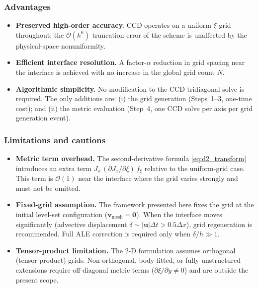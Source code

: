 \documentclass[10pt,a4paper,twocolumn]{article}
\newcommand{\Ord}[1]{\mathcal{O}(#1)}
\begin{document}
\subsubsection*{Advantages}
\begin{itemize}\setlength\itemsep{2pt}
  \item \textbf{Preserved high-order accuracy.}  CCD operates on a uniform
    $\xi$-grid throughout; the $\Ord{h^6}$ truncation error of the scheme
    is unaffected by the physical-space nonuniformity.
  \item \textbf{Efficient interface resolution.}  A factor-$\alpha$
    reduction in grid spacing near the interface is achieved with no
    increase in the global grid count $N$.
  \item \textbf{Algorithmic simplicity.}  No modification to the CCD
    tridiagonal solve is required.  The only additions are: (i) the grid
    generation (Steps~1--3, one-time cost); and (ii) the metric evaluation
    (Step~4, one CCD solve per axis per grid generation event).
\end{itemize}

\subsubsection*{Limitations and cautions}
\begin{itemize}\setlength\itemsep{2pt}
  \item \textbf{Metric term overhead.}
    The second-derivative formula \eqref{eq:d2_transform} introduces an
    extra term $J_x\,(\partial J_x/\partial\xi)\,f_\xi$ relative to the
    uniform-grid case.  This term is $\Ord{1}$ near the interface where
    the grid varies strongly and must not be omitted.
  \item \textbf{Fixed-grid assumption.}
    The framework presented here fixes the grid at the initial level-set
    configuration ($\mathbf{v}_\mathrm{mesh} = \mathbf{0}$).  When the
    interface moves significantly (advective displacement
    $\delta \sim |\mathbf{u}|\Delta t > 0.5\Delta x$), grid regeneration
    is recommended.  Full ALE correction is required only when
    $\delta/h \gg 1$.
  \item \textbf{Tensor-product limitation.}
    The 2-D formulation assumes orthogonal (tensor-product) grids.
    Non-orthogonal, body-fitted, or fully unstructured extensions require
    off-diagonal metric terms ($\partial\xi/\partial y \neq 0$) and are
    outside the present scope.
\end{itemize}
\end{document}
